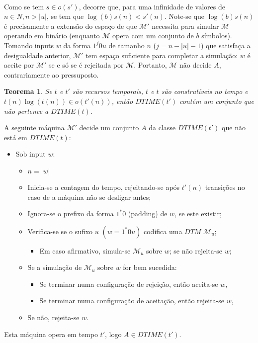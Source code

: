 \documentclass[10pt,a4paper]{report}
\newtheorem{theorem}{Teorema}
\begin{document}
\\
Como se tem $s \in o(s')$, decorre que, para uma infinidade de valores 
de $n \in N, n > |u|$, se tem que $\log(b)s(n) < s'(n)$. Note-se que $
\log(b)s(n)$ é precisamente a extensão do espaço de que $\mathcal{M'}$ 
necessita para simular $\mathcal{M}$ operando em binário (enquanto $
\mathcal{M}$ opera com um conjunto de $b$ símbolos). Tomando inputs $w$ 
da forma $1^j0u$ de tamanho $n$ ($j = n - |u| - 1$) que satisfaça a 
desigualdade anterior, $\mathcal{M'}$ tem espaço suficiente para 
completar a simulação: $w$ é aceite por $\mathcal{M'}$ se e só se é 
rejeitada por $\mathcal{M}$. Portanto, $\mathcal{M}$ não decide $A$, 
contrariamente ao pressuposto.
\begin{theorem}
Se $t$ e $t'$ são recursos temporais, $t$ e $t$ são construtíveis no tempo e $t(n) \log (t(n)) \in o(t'(n))$, então $DTIME(t')$ contém um conjunto que não pertence a $DTIME(t)$.
\end{theorem}
A seguinte máquina $\mathcal{M'}$ decide um conjunto $A$ da classe $DTIME(t')$ que não está em $DTIME(t)$:
\begin{itemize}
\item Sob input $w$:
\begin{itemize}
\item $n = |w|$
\item Inicia-se a contagem do tempo, rejeitando-se após $t'(n)$ transições no caso de a máquina não se desligar antes;
\item Ignora-se o prefixo da forma $1^*0$ (padding) de $w$, se este existir;
\item Verifica-se se o sufixo $u$ $(w = 1^*0u)$ codifica uma $DTM$ $\mathcal{M}_u$;
\begin{itemize}
\item Em caso afirmativo, simula-se $\mathcal{M}_u$ sobre $w$; se não rejeita-se $w$;
\end{itemize}
\item Se a simulação de $\mathcal{M}_u$ sobre $w$ for bem sucedida:
\begin{itemize}
\item Se terminar numa configuração de rejeição, então aceita-se $w$,
\item Se terminar numa configuração de aceitação, então rejeita-se $w$,
\end{itemize}
\item Se não, rejeita-se $w$.
\end{itemize}
\end{itemize}
Esta máquina opera em tempo $t'$, logo $A \in DTIME(t')$.\\
\end{document}
